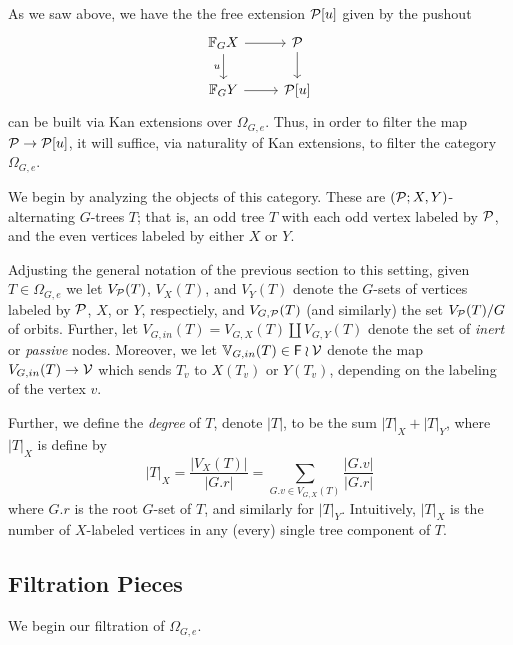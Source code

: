 \documentclass[a4paper,10pt]{article}%
\begin{document}
As we saw above, we have the the free extension $\P[u]$ given by the pushout
\[
\begin{tikzcd}
  \mathbb F_G X \arrow[d, "u"'] \arrow[r] & \P \arrow[d]\\
  \mathbb F_G Y \arrow[r] & \P[u]
\end{tikzcd}
\]
can be built via Kan extensions over $\Omega_{G,e}$. Thus, in order to filter the map $\P \to \P[u]$, it will suffice, via naturality of Kan extensions, to filter the category $\Omega_{G,e}$.

We begin by analyzing the objects of this category. These are $(\P; X,Y)$-alternating $G$-trees $T$; that is, an odd tree $T$ with each odd vertex labeled by $\P$, and the even vertices labeled by either $X$ or $Y$.

Adjusting the general notation of the previous section to this setting, given $T\in \Omega_{G,e}$ we let $V_{\P}(T)$, $V_{X}(T)$, and $V_{Y}(T)$ denote the $G$-sets of vertices labeled by $\P$, $X$, or $Y$, respectiely, and $V_{G,\P}(T)$ (and similarly) the set $V_{\P}(T)/G$ of orbits. Further, let $V_{G,in}(T) = V_{G,X}(T) \amalg V_{G,Y}(T)$ denote the set of \textit{inert} or \textit{passive} nodes. Moreover, we let $\mathbb V_{G,in}(T) \in \mathsf F \wr \V$ denote the map $V_{G,in}(T) \to \V$ which sends $T_v$ to $X(T_v)$ or $Y(T_v)$, depending on the labeling of the vertex $v$.

Further, we define the \textit{degree} of $T$, denote $|T|$, to be the sum $|T|_X + |T|_Y$, where $|T|_X$ is define by
\[
|T|_X = \dfrac{|V_X(T)|}{|G.r|} = \sum\limits_{G.v\in V_{G,X}(T)}\dfrac{|G.v|}{|G.r|}
\]
where $G.r$ is the root $G$-set of $T$, and similarly for $|T|_Y$. Intuitively, $|T|_X$ is the number of $X$-labeled vertices in any (every) single tree component of $T$.


\subsection{Filtration Pieces}

We begin our filtration of $\Omega_{G,e}$. 
\end{document}
